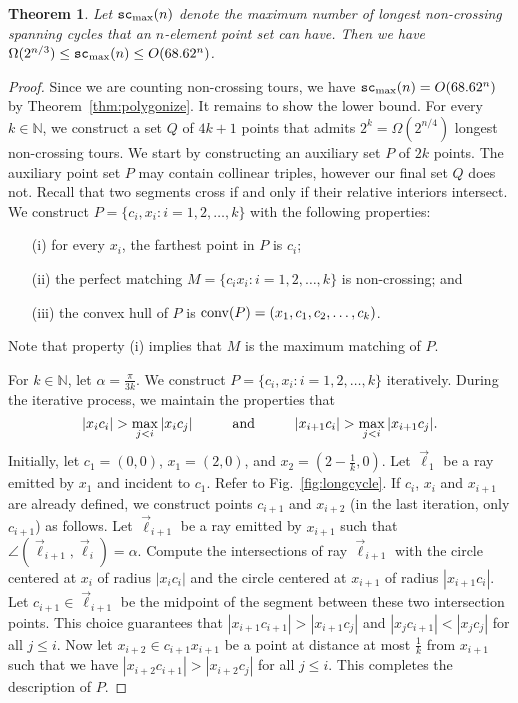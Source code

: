 \documentclass[11pt]{article}
\newtheorem{theorem}{Theorem}
\newcommand{\conv}{{\rm conv}}
\def\sc{{\tt sc}}
\begin{document}
\begin{theorem} \label{thm:max-tours}
Let $\sc_{\rm max}(n)$ denote the maximum number of longest non-crossing
spanning cycles that an $n$-element point set can have.
Then we have
$ \Omega(2^{n/3}) \leq \sc_{\rm max}(n) \leq O(68.62^n) $.
\end{theorem}
\begin{proof}
Since we are counting non-crossing tours,
we have $\sc_{\rm max}(n) =O(68.62^n)$ by Theorem~\ref{thm:polygonize}.
It remains to show the lower bound. For every $k\in \mathbb{N}$, we
construct a set $Q$ of $4k+1$ points that admits $2^k=\Omega(2^{n/4})$
longest non-crossing tours. We start by constructing an auxiliary
set $P$ of $2k$ points. The auxiliary point set $P$ may contain
collinear triples, however our final set $Q$ does not.
Recall that two segments cross if and only if their relative interiors intersect.
We construct $P=\{c_i,x_i:i=1,2,\ldots , k\}$ with the following properties:
\begin{itemize}\itemsep -2pt
\item[{\rm (i)}] for every $x_i$, the farthest point in $P$ is $c_i$;
\item[{\rm (ii)}] the perfect matching $M=\{c_ix_i:i=1,2,\ldots , k\}$ is non-crossing; and
\item[{\rm (iii)}] the convex hull of $P$ is $\conv(P)=(x_1,c_1,c_2,\ldots , c_k)$.
\end{itemize}
Note that property (i) implies that $M$ is the maximum matching of $P$.

For $k\in \mathbb{N}$, let $\alpha=\frac{\pi}{3k}$.
We construct $P=\{c_i,x_i:i=1,2,\ldots , k\}$ iteratively. During the
iterative process, we maintain the properties that
$$|x_ic_i|>\max_{j<i}|x_ic_j|\hspace{1cm}\mbox{\rm and}\hspace{1cm}|x_{i+1}c_i|>\max_{j<i}|x_{i+1}c_j|.$$
Initially, let $c_1=(0,0)$, $x_1=(2,0)$,
and $x_2=(2-\frac{1}{k},0)$. Let $\vec{\ell}_1$ be a ray emitted by $x_1$ and incident
to $c_1$. Refer to Fig.~\ref{fig:longcycle}.
If $c_i$, $x_i$ and $x_{i+1}$ are already defined, we construct points
$c_{i+1}$ and $x_{i+2}$ (in the last iteration, only $c_{i+1}$)
as follows. Let $\vec{\ell}_{i+1}$ be a ray emitted
by $x_{i+1}$ such that $\angle(\vec{\ell}_{i+1},\vec{\ell}_i) = \alpha$.
Compute the intersections of ray $\vec{\ell}_{i+1}$ with the circle centered at $x_i$
of radius $|x_ic_i|$ and the circle centered at $x_{i+1}$ of radius
$|x_{i+1}c_i|$. Let $c_{i+1} \in \vec{\ell}_{i+1}$ be the midpoint of
the segment between these two intersection points.
This choice guarantees that
$|x_{i+1}c_{i+1}|>|x_{i+1}c_j|$ and $|x_jc_{i+1}|<|x_jc_j|$ for all $j\leq i$.
Now let $x_{i+2}\in c_{i+1}x_{i+1}$ be a point at distance at most
$\frac{1}{k}$ from $x_{i+1}$ such that we have
$|x_{i+2}c_{i+1}|>|x_{i+2}c_j|$ for all $j\leq i$.
This completes the description of $P$.



\end{proof}
\end{document}
